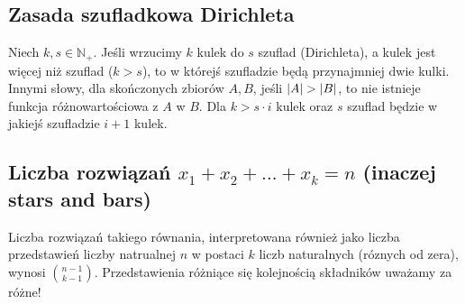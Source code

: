 \subsection*{Zasada szufladkowa Dirichleta}
Niech $k, s \in \mathbb{N}_+$. Jeśli wrzucimy $k$ kulek do $s$ szuflad (Dirichleta),
a kulek jest więcej niż szuflad ($k > s$), to w którejś szufladzie będą przynajmniej
dwie kulki. Innymi słowy, dla skończonych zbiorów $A, B$, jeśli $\left| A \right| > \left| B \right|$,
to nie istnieje funkcja różnowartościowa z $A$ w $B$. Dla $k > s\cdot i$ kulek oraz
$s$ szuflad będzie w jakiejś szufladzie $i + 1$ kulek.

\subsection*{Liczba rozwiązań $x_1 + x_2 + \ldots + x_k = n$ (inaczej
stars and bars)}
Liczba rozwiązań takiego równania, interpretowana również jako liczba przedstawień
liczby natrualnej $n$ w postaci $k$ liczb naturalnych (róznych od zera), wynosi
$\binom{n-1}{k-1}$. Przedstawienia różniące się kolejnością składników uważamy
za różne!